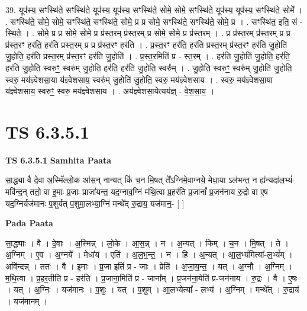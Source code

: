 \documentclass[17pt]{extarticle}
\begin{document}
39. यूप॑स्य॒ सꣳस्थि॑ते॒ सꣳस्थि॑ते॒ यूप॑स्य॒ यूप॑स्य॒ सꣳस्थि॑ते॒ सोमे॒ सोमे॒ सꣳस्थि॑ते॒ यूप॑स्य॒ यूप॑स्य॒ सꣳस्थि॑ते॒ सोमे᳚ । . सꣳस्थि॑ते॒ सोमे॒ सोमे॒ सꣳस्थि॑ते॒ सꣳस्थि॑ते॒ सोमे॒ प्र प्र सोमे॒ सꣳस्थि॑ते॒ सꣳस्थि॑ते॒ सोमे॒ प्र । . सꣳस्थि॑त॒ इति॒ सं - स्थि॒ते॒ । . सोमे॒ प्र प्र सोमे॒ सोमे॒ प्र प्र॑स्त॒रम् प्र॑स्त॒रम् प्र सोमे॒ सोमे॒ प्र प्र॑स्त॒रम् । . प्र प्र॑स्त॒रम् प्र॑स्त॒रम् प्र प्र प्र॑स्त॒रꣳ हर॑ति॒ हर॑ति प्रस्त॒रम् प्र प्र प्र॑स्त॒रꣳ हर॑ति । . प्र॒स्त॒रꣳ हर॑ति॒ हर॑ति प्रस्त॒रम् प्र॑स्त॒रꣳ हर॑ति जु॒होति॑ जु॒होति॒ हर॑ति प्रस्त॒रम् प्र॑स्त॒रꣳ हर॑ति जु॒होति॑ । . प्र॒स्त॒रमिति॑ प्र - स्त॒रम् । . हर॑ति जु॒होति॑ जु॒होति॒ हर॑ति॒ हर॑ति जु॒होति॒ स्वरुꣳ॒॒ स्वरु॑म् जु॒होति॒ हर॑ति॒ हर॑ति जु॒होति॒ स्वरु᳚म् । . जु॒होति॒ स्वरुꣳ॒॒ स्वरु॑म् जु॒होति॑ जु॒होति॒ स्वरु॒ मय॑ज्ञ्वेशसा॒या य॑ज्ञ्वेशसाय॒ स्वरु॑म् जु॒होति॑ जु॒होति॒ स्वरु॒ मय॑ज्ञ्वेशसाय । . स्वरु॒ मय॑ज्ञ्वेशसा॒या य॑ज्ञ्वेशसाय॒ स्वरुꣳ॒॒ स्वरु॒ मय॑ज्ञ्वेशसाय । . अय॑ज्ञ्वेशसा॒येत्यय॑ज्ञ् - वे॒श॒सा॒य॒ । \newline
\pagebreak
{}

\section{ TS 6.3.5.1 }

\textbf{TS 6.3.5.1 } \newline
\textbf{Samhita Paata} \newline

सा॒द्ध्या वै दे॒वा अ॒स्मिॅल्लो॒क आ॑स॒न् नान्यत् किं॑ च॒न मि॒षत् ते᳚ऽग्निमे॒वाग्नये॒ मेधा॒या ऽल॑भन्त॒ न ह्य॑न्यदा॑ल॒भ्यं॑-मवि॑न्द॒न् ततो॒ वा इ॒माः प्र॒जाः प्राजा॑यन्त॒ यद॒ग्नाव॒ग्निं म॑थि॒त्वा प्र॒हर॑ति प्र॒जानां᳚ प्र॒जन॑नाय रु॒द्रो वा ए॒ष यद॒ग्निर्यज॑मानः प॒शुर्यत् प॒शुमा॒लभ्या॒ग्निं मन्थे᳚द् रु॒द्राय॒ यज॑मान॒- [  ] \newline

\textbf{Pada Paata} \newline

सा॒द्ध्याः । वै । दे॒वाः । अ॒स्मिन्न् । लो॒के । आ॒स॒न्न् । न । अ॒न्यत् । किम् । च॒न । मि॒षत् । ते । अ॒ग्निम् । ए॒व । अ॒ग्नये᳚ । मेधा॑य । एति॑ । अ॒ल॒भ॒न्त॒ । न । हि । अ॒न्यत् । आ॒ल॒भ्यं॑मित्या᳚-ल॒भ्यं᳚म् । अवि॑न्दन्न् । ततः॑ । वै । इ॒माः । प्र॒जा इति॑ प्र - जाः । प्रेति॑ । अ॒जा॒य॒न्त॒ । यत् । अ॒ग्नौ । अ॒ग्निम् । म॒थि॒त्वा । प्र॒हर॒तीति॑ प्र - हर॑ति । प्र॒जाना॒मिति॑ प्र - जाना᳚म् । प्र॒जन॑ना॒येति॑ प्र-जन॑नाय । रु॒द्रः । वै । ए॒षः । यत् । अ॒ग्निः । यज॑मानः । प॒शुः । यत् । प॒शुम् । आ॒लभ्येत्या᳚ - लभ्य॑ । अ॒ग्निम् । मन्थे᳚त् । रु॒द्राय॑ । यज॑मानम् ।  \newline
\end{document}
